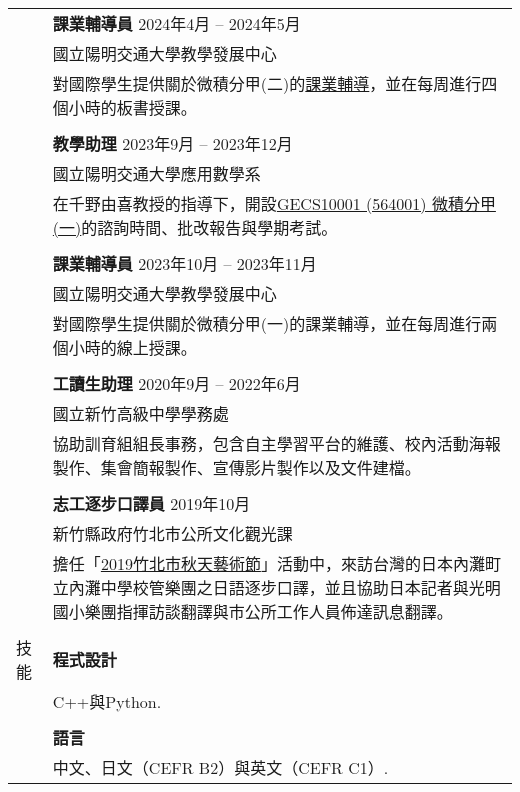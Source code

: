 \documentclass[letterpaper, 11pt]{article}
\begin{document}
\begin{CJK*}{UTF8}{bsmi}
\begin{center}
\begin{longtable}{p{0.72in}p{5.97in}}
        & \textbf{課業輔導員} \hfill 2024年4月 -- 2024年5月 \\
        & 國立陽明交通大學教學發展中心\\
        & 對國際學生提供關於微積分甲(二)的\href{https://github.com/eiken59/2024_II_Tutor}{課業輔導}，並在每周進行四個小時的板書授課。\\
        & \\

        & \textbf{教學助理} \hfill 2023年9月 -- 2023年12月 \\
        & 國立陽明交通大學應用數學系\\
        & 在千野由喜教授的指導下，開設\href{https://timetable.nycu.edu.tw/?r=main/crsoutline&Acy=112&Sem=1&CrsNo=564001&lang=zh-tw}{GECS10001 (564001) 微積分甲(一)}的諮詢時間、批改報告與學期考試。\\
        & \\

        & \textbf{課業輔導員} \hfill 2023年10月 -- 2023年11月 \\
        & 國立陽明交通大學教學發展中心\\
        & 對國際學生提供關於微積分甲(一)的課業輔導，並在每周進行兩個小時的線上授課。\\
        & \\
        
        & \textbf{工讀生助理} \hfill 2020年9月 -- 2022年6月 \\
        & 國立新竹高級中學學務處\\
        & 協助訓育組組長事務，包含自主學習平台的維護、校內活動海報製作、集會簡報製作、宣傳影片製作以及文件建檔。\\
        & \\

        & \textbf{志工逐步口譯員} \hfill 2019年10月\\
        & 新竹縣政府竹北市公所文化觀光課\\
        & 擔任「\href{https://www.chupei.gov.tw/travel/p2_1_2.php?bigact_id=111}{2019竹北市秋天藝術節}」活動中，來訪台灣的日本內灘町立內灘中學校管樂團之日語逐步口譯，並且協助日本記者與光明國小樂團指揮訪談翻譯與市公所工作人員佈達訊息翻譯。\\
        & \\
        
        
        {\textcolor{OliveGreen}{技能}} 
        & \textbf{程式設計}\\
        & C++與Python. \\
        & \\
        
        & \textbf{語言} \\
        & 中文、日文（CEFR B2）與英文（CEFR C1）. \\
        
        
    \end{longtable}
\end{center}

\end{CJK*}
\end{document}
